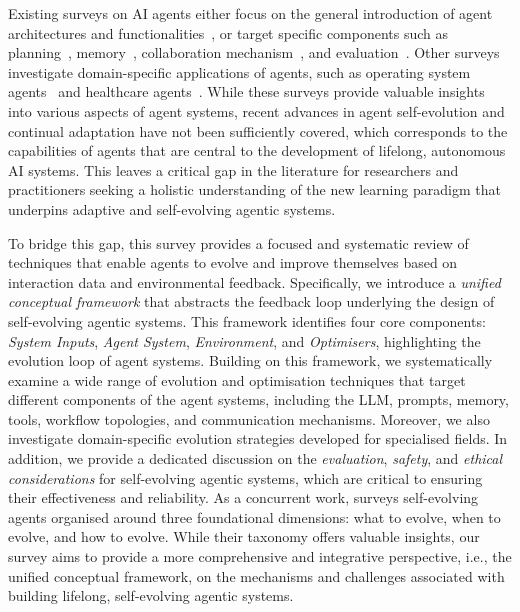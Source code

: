 \documentclass[]{selfevolagent}
\theoremstyle{plain}
\theoremstyle{definition}
\theoremstyle{remark}
\begin{document}
Existing surveys on AI agents either focus on the general introduction of agent architectures and functionalities~\citep{wang2024survey,guo2024large,xi2025the,luo2025large,liu2025advances,liu2025sew}, or target specific components such as planning~\citep{huang2024understanding}, memory~\citep{zhang2024survey}, collaboration mechanism~\citep{tran2025multi}, and evaluation~\citep{yehudai2025survey}. Other surveys investigate domain-specific applications of agents, such as operating system agents~\citep{hu2025agents} and healthcare agents~\citep{sulis2023survey}.   While these surveys provide valuable insights into various aspects of agent systems, recent advances in agent self-evolution and continual adaptation have not been sufficiently covered, which corresponds to the capabilities of agents that are central to the development of lifelong, autonomous AI systems. This leaves a critical gap in the literature for researchers and practitioners seeking a holistic understanding of the new learning paradigm that underpins adaptive and self-evolving agentic systems. 

To bridge this gap, this survey provides a focused and systematic review of techniques that enable agents to evolve and improve themselves based on interaction data and environmental feedback. Specifically, we introduce a \textit{unified conceptual framework} that abstracts the feedback loop underlying the design of self-evolving agentic systems. This framework identifies four core components: \textit{System Inputs}, \textit{Agent System}, \textit{Environment}, and \textit{Optimisers}, highlighting the evolution loop of agent systems. Building on this framework, we systematically examine a wide range of evolution and optimisation techniques that target different components of the agent systems, including the LLM, prompts, memory, tools, workflow topologies, and communication mechanisms. Moreover, we also investigate domain-specific evolution strategies developed for specialised fields. In addition, we provide a dedicated discussion on the \textit{evaluation}, \textit{safety}, and \textit{ethical considerations} for self-evolving agentic systems, which are critical to ensuring their effectiveness and reliability. 
As a concurrent work, \cite{gao2025survey} surveys self-evolving agents organised around three foundational dimensions: what to evolve, when to evolve, and how to evolve. While their taxonomy offers valuable insights, our survey aims to provide a more comprehensive and integrative perspective, i.e., the unified conceptual framework, on the mechanisms and challenges associated with building lifelong, self-evolving agentic systems. 
\end{document}
